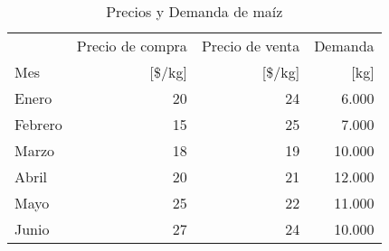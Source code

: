 \begin{table}[H]
\centering
\begin{tabular}{lrrr}
\hline
		& Precio de compra	& Precio de venta	& Demanda	\\
Mes		& [\$/kg]		& [\$/kg]		& [kg] 		\\ \hline
Enero		& 20			& 24			& 6.000		\\
Febrero		& 15			& 25			& 7.000	\\
Marzo		& 18			& 19			& 10.000	\\
Abril		& 20			& 21			& 12.000	\\
Mayo		& 25			& 22			& 11.000	\\
Junio		& 27			& 24			& 10.000	\\
 \hline
\end{tabular}
\caption{Precios y Demanda de maíz}
\label{tabla:6}
\end{table}

